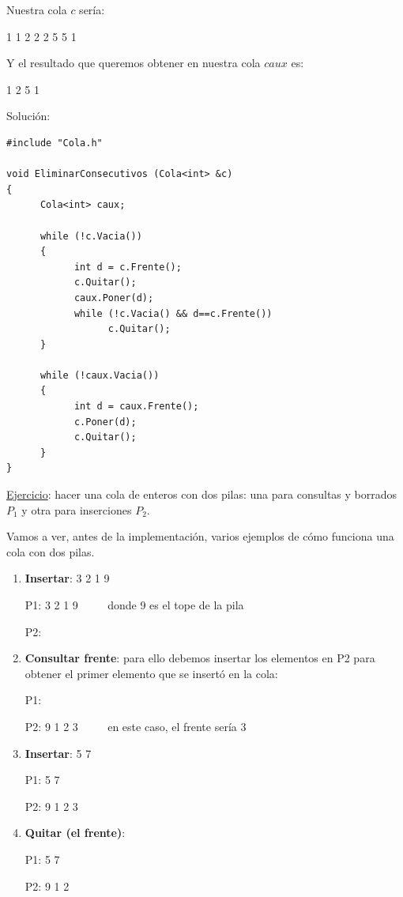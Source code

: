 \documentclass[10pt,a4paper,spanish]{report}
\begin{document}
\noindent
Nuestra cola $c$ sería:
\begin{center} 1 1 2 2 2 5 5 1 \end{center}

\noindent
Y el resultado que queremos obtener en nuestra cola $caux$ es:
\begin{center} 1 2 5 1 \end{center}

\noindent
Solución:
\begin{verbatim}
#include "Cola.h"

void EliminarConsecutivos (Cola<int> &c)
{
      Cola<int> caux;

      while (!c.Vacia())
      {
            int d = c.Frente();
            c.Quitar();
            caux.Poner(d);
            while (!c.Vacia() && d==c.Frente())
                  c.Quitar();
      }

      while (!caux.Vacia())
      {
            int d = caux.Frente();
            c.Poner(d);
            c.Quitar();
      }
}
\end{verbatim}

\noindent
\underline{Ejercicio}: hacer una cola de enteros con dos pilas: una para consultas y borrados $P_{1}$ y otra para inserciones $P_{2}$.

\noindent
Vamos a ver, antes de la implementación, varios ejemplos de cómo funciona una cola con dos pilas.

\begin{enumerate}
\item \textbf{\textcolor[rgb]{0.2,0.5,0.5}{Insertar}}: 3 2 1 9

P1: 3 2 1 9 $\qquad$ donde 9 es el tope de la pila

P2:

\item \textbf{\textcolor[rgb]{0.2,0.5,0.5}{Consultar frente}}: para ello debemos insertar los elementos en P2 para obtener el primer elemento que se insertó en la cola:

P1:

P2: 9 1 2 3 $\qquad$ en este caso, el frente sería 3

\item \textbf{\textcolor[rgb]{0.2,0.5,0.5}{Insertar}}: 5 7

P1: 5 7

P2: 9 1 2 3

\item \textbf{\textcolor[rgb]{0.2,0.5,0.5}{Quitar (el frente)}}:

P1: 5 7

P2: 9 1 2
\end{enumerate}
\end{document}
